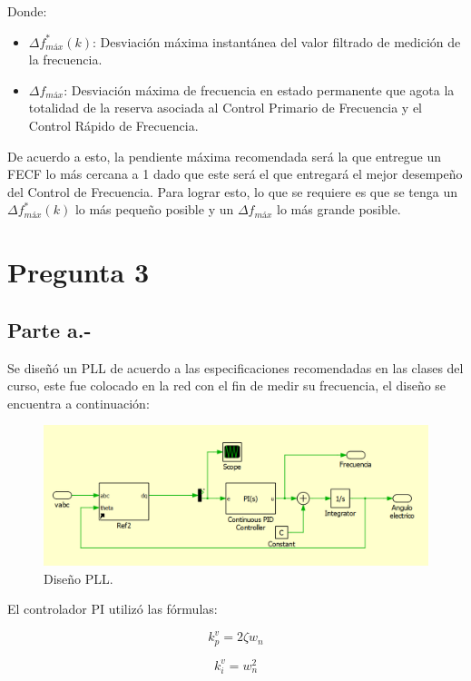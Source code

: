 Donde:

\begin{itemize}
    \item $\Delta f^*_{máx}(k)$: Desviación máxima instantánea del valor filtrado de medición de la frecuencia.
    \item $\Delta f_{máx}$: Desviación máxima de frecuencia en estado permanente que agota la totalidad de la reserva asociada al Control Primario de Frecuencia y el Control Rápido de Frecuencia.
\end{itemize}

De acuerdo a esto, la pendiente máxima recomendada será la que entregue un FECF lo más cercana a 1 dado que este será el que entregará el mejor desempeño del Control de Frecuencia. Para lograr esto, lo que se requiere es que se tenga un $\Delta f^*_{máx}(k)$ lo más pequeño posible y un $\Delta f_{máx}$ lo más grande posible.

\section{Pregunta 3}

\subsection{Parte a.-}

Se diseñó un PLL de acuerdo a las especificaciones recomendadas en las clases del curso, este fue colocado en la red con el fin de medir su frecuencia, el diseño se encuentra a continuación:

\begin{figure}
   \centering
   \includegraphics[width=0.5\linewidth]{Tarea 1/report/imagenes/p3a/pllred.png}
   \caption{Diseño PLL.}
   \label{diseñopll}
\end{figure}

El controlador PI utilizó las fórmulas:

\begin{equation}
    k_p^v = 2\zeta w_{n}
\end{equation}

\begin{equation}
    k_i^v = w_{n}^2
\end{equation}

